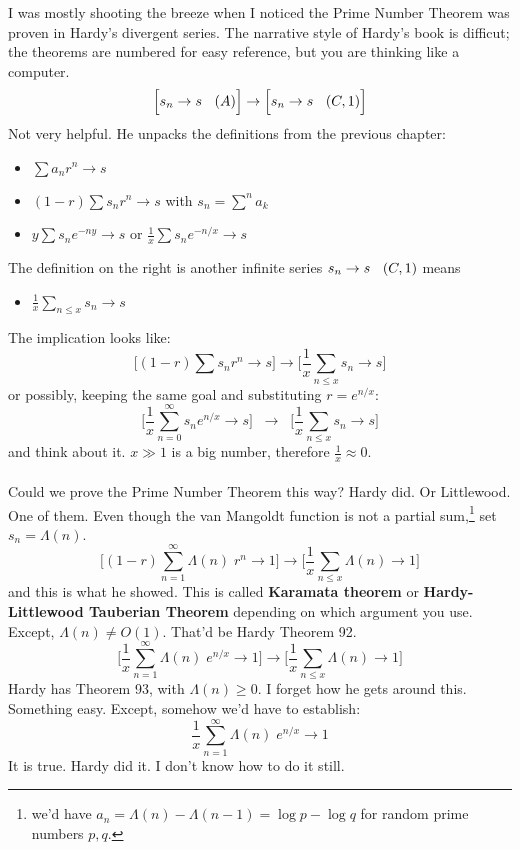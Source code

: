 \documentclass[12pt]{article}
\begin{document}
\noindent I was mostly shooting the breeze when I noticed the Prime Number Theorem was proven in Hardy's divergent series.  The narrative style of Hardy's book is difficut; the theorems are numbered for easy reference, but you are thinking like a computer. 
$$ \Big[ s_n \to s\hspace{0.125in}(A) \Big] \to \Big[ s_n \to s\hspace{0.125in}(C,1) \Big]  $$
Not very helpful.  He unpacks the definitions from the previous chapter:
\begin{itemize}
\item $ \sum a_n r^n \to s  $
\item $ (1-r) \sum s_n r^n \to s  $ with $\displaystyle s_n = \sum^n a_k$
\item $ y \sum s_n e^{-ny} \to s $ or $\frac{1}{x} \sum s_n e^{-n/x} \to s$
\end{itemize} 
The definition on the right is another infinite series $s_n \to s \hspace{0.125in} (C,1)$ means
\begin{itemize}
\item $\frac{1}{x} \sum_{n \leq x} s_n \to s $
\end{itemize}
The implication looks like:
$$ \Bigg[ (1-r) \sum s_n r^n \to s \Bigg] \to \Bigg[ \frac{1}{x} \sum_{n \leq x} s_n \to s \Bigg]  $$
or possibly, keeping the same goal and substituting $r = e^{n/x}$: 
$$ \Bigg[ \frac{1}{x} \sum_{n=0}^\infty s_n e^{n/x} \to s \Bigg] \;\;\to \;\;\Bigg[ \frac{1}{x} \sum_{n \leq x} s_n \to s \Bigg]  $$
and think about it.  $x \gg 1$ is a big number, therefore $\frac{1}{x} \approx 0$. \\ \\ Could we prove the Prime Number Theorem this way?  Hardy did.  Or Littlewood.  One of them.  Even though the van Mangoldt function is not a partial sum,\footnote{we'd have $a_n = \Lambda(n) - \Lambda(n-1) = \log p - \log q$ for random prime numbers $p,q$. } set $s_n = \Lambda(n) $.
$$ \Bigg[ (1-r) \sum_{n=1}^\infty \Lambda(n) \; r^n \to 1 \Bigg] \to \Bigg[ \frac{1}{x} \sum_{n \leq x} \Lambda(n) \to 1 \Bigg]  $$
and this is what he showed.  This is called \textbf{Karamata theorem} or \textbf{Hardy-Littlewood Tauberian Theorem} depending on which argument you use.  Except, $\Lambda(n) \neq O(1)$.  That'd be Hardy Theorem 92.
$$ \Bigg[ \frac{1}{x} \sum_{n=1}^\infty \Lambda(n) \; e^{n/x} \to 1 \Bigg] \to \Bigg[ \frac{1}{x} \sum_{n \leq x} \Lambda(n) \to 1 \Bigg]  $$
Hardy has Theorem 93, with $\Lambda(n) \geq 0$.  I forget how he gets around this.  Something easy.  Except, somehow we'd have to establish: 
$$ \frac{1}{x} \sum_{n=1}^\infty \Lambda(n) \; e^{n/x} \to 1 $$
It is true.  Hardy did it.  I don't know how to do it still.
\end{document}
